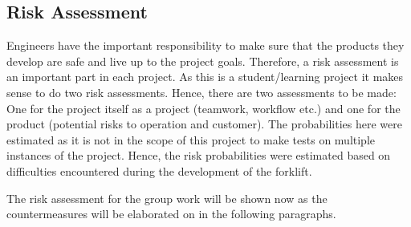 \documentclass[../report.tex]{subfiles}
\begin{document}
\subsection{Risk Assessment}
Engineers have the important responsibility to make sure that the products
they develop are safe and live up to the project goals. Therefore, a
risk assessment is an important part in each project. As this is a student/learning
project it makes sense to do two risk assessments. Hence, there are two assessments to be made: 
One for the project itself as a project (teamwork, workflow etc.) and one for the product (potential risks to 
operation and customer). The probabilities here were estimated as it is not in the scope of 
this project to make tests on multiple instances of the project. Hence, the risk probabilities were estimated 
based on difficulties encountered during the development of the forklift.

The risk assessment for the group work will be shown now as the countermeasures will be 
elaborated on in the following paragraphs.
\end{document}
